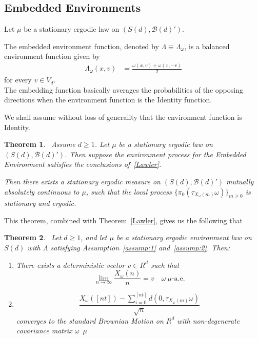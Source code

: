 \documentclass[final]{aomart}
\def\mathscr#1{#1}%
\def\mathbb#1{#1}%
\theoremstyle{plain}
\newtheorem{theorem}{Theorem}[section]
\theoremstyle{definition}
\theoremstyle{remark}
\begin{document}
\subsection{Embedded Environments}
Let $\mu$ be a stationary ergodic law on $(\mathscr{S}(d),\mathcal{B}(d)')$.

The embedded environment function, denoted by
$\Lambda \equiv \Lambda_\omega$, is a balanced environment function given by
\begin{align}
\Lambda_{\omega}(x,v) 
&= \frac{\omega(x,v) + \omega(x,-v)}{2}
\end{align}
for every $v \in V_d$. \\

The embedding function basically averages the probabilities of the opposing directions when the environment function is the Identity function. 

We shall assume without loss of generality that the environment function is Identity.

\begin{theorem}~\label{Master}
    Assume $d\geq1$. Let $\mu$ be a stationary ergodic law on $(\mathscr{S}(d), \mathcal{B}(d)')$. Then suppose the environment process for the Embedded Environment satisfies the conclusions of~\ref{Lawler}.
     
    Then there exists a stationary ergodic measure on $(\mathscr{S}(d), \mathcal{B}(d)')$ mutually absolutely continuous to $\mu$, such that the local process $\{\pi_0(\tau_{X_\omega(m)}\omega)\}_{m\geq0}$ is stationary and ergodic. 
\end{theorem}
This theorem, combined with Theorem~\ref{Lawler}, gives us the following that 
\begin{theorem}~\label{Master2}
   Let $d \geq 1$, and let $\mu$ be a stationary ergodic environment law on $\mathscr{S}(d)$ with $\Lambda$ satisfying Assumption~\ref{assump:1} and~\ref{assump:2}. Then:

\begin{enumerate}
    \item[(i)] There exists a deterministic vector $v \in \mathbb{R}^d$ such that
    \[
    \lim_{n \to \infty} \frac{X_\omega(n)}{n} = v \quad \omega~\text{$\mu$-a.e}.
    \]

    \item[(ii)] \[
    \frac{X_\omega([nt]) - \sum_{i=0}^{[nt]} d(0, \tau_{X_{\omega}(m)} \omega)}{\sqrt{n}}
    \]
    converges to the standard Brownian Motion on $\mathbb{R}^d$ with non-degenerate covariance matrix $\omega$~$\mu$ 
\end{enumerate}
\end{theorem}
\end{document}

